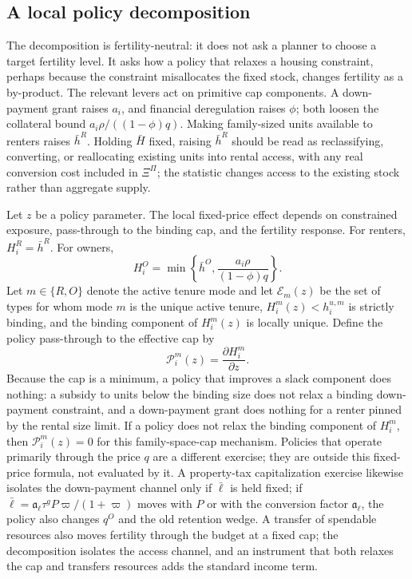 \documentclass[11pt]{article}
\newcommand{\1}{\mathbf 1}
\begin{document}
\subsection{A local policy decomposition}

The decomposition is fertility-neutral: it does not ask a planner to choose a target fertility level. It asks how a policy that relaxes a housing constraint, perhaps because the constraint misallocates the fixed stock, changes fertility as a by-product. The relevant levers act on primitive cap components. A down-payment grant raises $a_i$, and financial deregulation raises $\phi$; both loosen the collateral bound $a_i\rho/((1-\phi)q)$. Making family-sized units available to renters raises $\bar h^R$. Holding $\bar H$ fixed, raising $\bar h^R$ should be read as reclassifying, converting, or reallocating existing units into rental access, with any real conversion cost included in $\Xi^\Pi$; the statistic changes access to the existing stock rather than aggregate supply.

Let $z$ be a policy parameter. The local fixed-price effect depends on constrained exposure, pass-through to the binding cap, and the fertility response. For renters, $H_i^R=\bar h^R$. For owners,
\[
H_i^O
=
\min\left\{
\bar h^O,
\frac{a_i\rho}{(1-\phi)q}
\right\}.
\]
Let $m\in\{R,O\}$ denote the active tenure mode and let $\mathcal E_m(z)$ be the set of types for whom mode $m$ is the unique active tenure, $H_i^m(z)<h_i^{u,m}$ is strictly binding, and the binding component of $H_i^m(z)$ is locally unique. Define the policy pass-through to the effective cap by
\[
\mathcal P_i^m(z)=\frac{\partial H_i^m}{\partial z}.
\]
Because the cap is a minimum, a policy that improves a slack component does nothing: a subsidy to units below the binding size does not relax a binding down-payment constraint, and a down-payment grant does nothing for a renter pinned by the rental size limit. If a policy does not relax the binding component of $H_i^m$, then $\mathcal P_i^m(z)=0$ for this family-space-cap mechanism. Policies that operate primarily through the price $q$ are a different exercise; they are outside this fixed-price formula, not evaluated by it. A property-tax capitalization exercise likewise isolates the down-payment channel only if $\bar\ell$ is held fixed; if $\bar\ell=\mathfrak a_\ell\tau^gP\varpi/(1+\varpi)$ moves with $P$ or with the conversion factor $\mathfrak a_\ell$, the policy also changes $q^O$ and the old retention wedge. A transfer of spendable resources also moves fertility through the budget at a fixed cap; the decomposition isolates the access channel, and an instrument that both relaxes the cap and transfers resources adds the standard income term.
\end{document}
